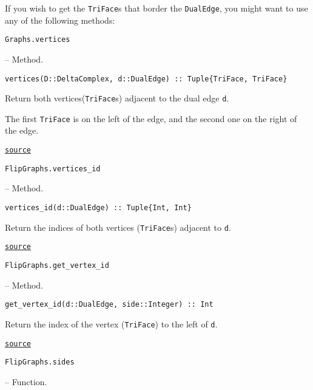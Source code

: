 If you wish to get the \texttt{TriFace}s that border the \texttt{DualEdge}, you might want to use any of the following methods:


\hypertarget{14467734776111556954}{\texttt{Graphs.vertices}}  -- {Method.}

\begin{adjustwidth}{2em}{0pt}


\begin{verbatim}
vertices(D::DeltaComplex, d::DualEdge) :: Tuple{TriFace, TriFace}
\end{verbatim}

Return both vertices(\texttt{TriFace}s) adjacent to the dual edge \texttt{d}.

The first \texttt{TriFace} is on the left of the edge, and the second one on the right of the edge.



\href{https://github.com/schto223/FlipGraphs.jl/blob/490c01a7adf74b42f27dda05099165c47ae8133e/src/deltaComplex.jl#L299-L305}{\texttt{source}}


\end{adjustwidth}
\hypertarget{3945932976546166137}{\texttt{FlipGraphs.vertices\_id}}  -- {Method.}

\begin{adjustwidth}{2em}{0pt}


\begin{verbatim}
vertices_id(d::DualEdge) :: Tuple{Int, Int}
\end{verbatim}

Return the indices of both vertices (\texttt{TriFace}s) adjacent to \texttt{d}.



\href{https://github.com/schto223/FlipGraphs.jl/blob/490c01a7adf74b42f27dda05099165c47ae8133e/src/deltaComplex.jl#L97-L101}{\texttt{source}}


\end{adjustwidth}
\hypertarget{2037339518078384361}{\texttt{FlipGraphs.get\_vertex\_id}}  -- {Method.}

\begin{adjustwidth}{2em}{0pt}


\begin{verbatim}
get_vertex_id(d::DualEdge, side::Integer) :: Int
\end{verbatim}

Return the index of the vertex (\texttt{TriFace}) to the left of \texttt{d}.



\href{https://github.com/schto223/FlipGraphs.jl/blob/490c01a7adf74b42f27dda05099165c47ae8133e/src/deltaComplex.jl#L104-L108}{\texttt{source}}


\end{adjustwidth}
\hypertarget{4237288860456336970}{\texttt{FlipGraphs.sides}}  -- {Function.}

